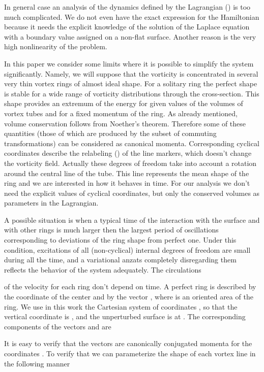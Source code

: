 In general case an analysis of the dynamics defined by the Lagrangian 
() is too much complicated. We do not even have the exact expression for
the Hamiltonian  because it needs the 
explicit knowledge of the solution of the Laplace equation with a boundary value 
assigned on a non-flat surface. Another reason is the very high nonlinearity
of the problem.

In this paper we consider some limits where it 
is possible to simplify the system significantly. Namely, we will 
suppose that the vorticity is concentrated in several very thin vortex 
rings of almost ideal shape. For a solitary ring the perfect shape 
is stable for a wide range of vorticity distributions through the cross-section. 
This shape provides an extremum of the energy for given values of the volumes
of vortex tubes  and for a fixed momentum of the ring. As already 
mentioned, volume conservation follows from  Noether's theorem.
Therefore some of these quantities (those of which 
are produced by the subset of commuting transformations) 
can be considered as canonical momenta.
Corresponding cyclical coordinates describe the relabeling ()
of the line markers, which doesn't change the vorticity field. Actually these 
degrees of freedom take into account a rotation around the central line of the 
tube. This line represents the mean shape of the ring and we are interested in how
it behaves in time. For our analysis we don't need the explicit values 
of cyclical coordinates, but only the conserved volumes as parameters 
in the Lagrangian. 

A possible situation is  
when a typical time of the interaction with the surface and with other rings is
much larger then the largest period of oscillations corresponding to deviations 
of the ring shape from perfect one. Under this condition, excitations of all 
(non-cyclical) internal degrees of freedom are small during all the time, 
and a variational anzats completely disregarding them 
reflects the behavior of the system adequately. The circulations  
 
of the velocity for each ring don't depend on time. 
A perfect ring is described by the coordinate 
of the center and by the vector , where
 is an oriented area of the ring. We use in this work 
the Cartesian system of coordinates , so that 
the vertical coordinate is , and the unperturbed surface is at .
The corresponding components of the vectors  and  are

It is easy to verify that the 
vectors  are canonically conjugated momenta for the coordinates 
. To verify that we can parameterize the shape of each
vortex line in the following manner

